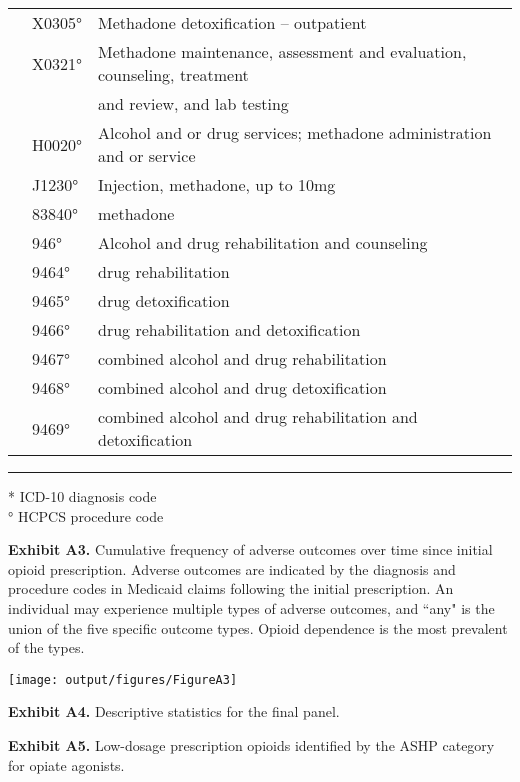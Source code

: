 \documentclass[11pt, letter]{article}
\begin{document}
\begin{tabular}{lll}
 & X0305° & Methadone detoxification – outpatient \\
 & X0321° & Methadone maintenance, assessment and evaluation, counseling, treatment \\
 &  & and review, and lab testing \\
 & H0020° & Alcohol and or drug services; methadone administration and or service \\
 & J1230° & Injection, methadone, up to 10mg \\
 & 83840° & methadone \\
 & 946° & Alcohol and drug rehabilitation and counseling \\
 & 9464° & drug rehabilitation \\
 & 9465° & drug detoxification \\
 & 9466° & drug rehabilitation and detoxification \\
 & 9467° & combined alcohol and drug rehabilitation \\
 & 9468° & combined alcohol and drug detoxification \\
 & 9469° & combined alcohol and drug rehabilitation and detoxification \\[1em]
\end{tabular}

\hrule

\footnotesize
* ICD-10 diagnosis code \\
° HCPCS procedure code
\normalsize

\newpage

\textbf{Exhibit A3.} Cumulative frequency of adverse outcomes over time since initial opioid prescription. Adverse outcomes are indicated by the diagnosis and procedure codes in Medicaid claims following the initial prescription. An individual may experience multiple types of adverse outcomes, and ``any" is the union of the five specific outcome types. Opioid dependence is the most prevalent of the types.

\texttt{[image: output/figures/FigureA3]}

\newpage

\textbf{Exhibit A4.} Descriptive statistics for the final panel.



\newpage

\textbf{Exhibit A5.} Low-dosage prescription opioids identified by the ASHP category for opiate agonists.

\tiny

\end{document}
